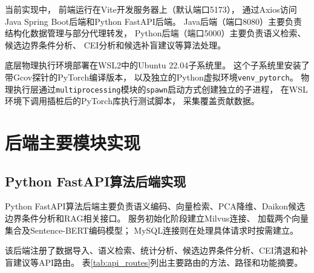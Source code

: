当前实现中，
前端运行在Vite开发服务器上（默认端口5173），
通过Axios访问Java Spring Boot后端和Python FastAPI后端。
Java后端（端口8080）主要负责结构化数据管理与部分代理转发，
Python后端（端口5000）主要负责语义检索、候选边界条件分析、
CEI分析和候选补盲建议等算法处理。

底层物理执行环境部署在WSL2中的Ubuntu 22.04子系统里。
这个子系统里安装了带Gcov探针的PyTorch编译版本，
以及独立的Python虚拟环境\texttt{venv\_pytorch}。
物理执行层通过\texttt{multiprocessing}模块的\texttt{spawn}启动方式创建独立的子进程，
在WSL环境下调用插桩后的PyTorch库执行测试脚本，
采集覆盖贡献数据。

\section{后端主要模块实现}

\subsection{Python FastAPI算法后端实现}

Python FastAPI算法后端主要负责语义编码、向量检索、PCA降维、Daikon候选边界条件分析和RAG相关接口。
服务初始化阶段建立Milvus连接、
加载两个向量集合及Sentence-BERT编码模型；
MySQL连接则在处理具体请求时按需建立。

该后端注册了数据导入、语义检索、统计分析、候选边界条件分析、CEI清退和补盲建议等API路由。
表\ref{tab:api_routes}列出主要路由的方法、路径和功能摘要。

